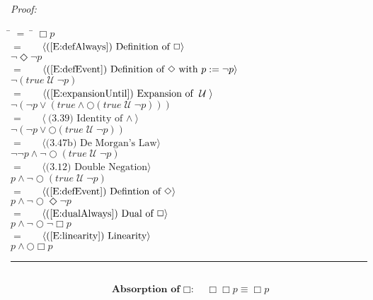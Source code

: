 \documentclass[fleqn, leqno]{article}
\newcommand{\lgap}{2pt}                             %
\newcommand{\mymathindent}{24pt}                    %
\newcommand{\Until}{\;\mathcal{U}\;}
\newcommand{\Next}{\bigcirc}
\newcommand{\Event}{\Diamond}
\newcommand{\Always}{\Box}
\newcommand{\myqed}{\hfill\rule[-.23ex]{1.2ex}{2.0ex}}
\newcommand{\Gll} {\langle}                         %
\newcommand{\Ggg} {\rangle}                         %
\newcommand{\Hint}[1]     {\ \ \ $\Gll              \mbox{#1} \Ggg$ }   %
\begin{document}
\emph{Proof:}
\begin{tabbing}
\hspace{\mymathindent} \= $= \;$ \= \kill
  \> \>   $\Always p$\\[\lgap]
  \> $=$  \>  \Hint{(\ref{E:defAlways}) Definition of $\Always$}\\[\lgap]
  \> \>   $\lnot\Event\lnot p$\\[\lgap]
  \> $=$  \>  \Hint{(\ref{E:defEvent}) Definition of $\Event$ with $p := \lnot p$}\\[\lgap]
  \> \>   $\lnot(true \Until \lnot p)$\\[\lgap]
  \> $=$  \>  \Hint{(\ref{E:expansionUntil}) Expansion of $\Until$}\\[\lgap]
  \> \>   $\lnot(\lnot p \lor (true \land \Next(true \Until \lnot p)))$\\[\lgap]
  \> $=$  \>  \Hint{(3.39) Identity of $\land$}\\[\lgap]
  \> \>   $\lnot(\lnot p \lor \Next(true \Until \lnot p))$\\[\lgap]
  \> $=$  \>  \Hint{(3.47b) De Morgan's Law}\\[\lgap]
  \> \>   $\lnot\lnot p \land \lnot\Next(true \Until \lnot p)$\\[\lgap]
  \> $=$  \>  \Hint{(3.12) Double Negation}\\[\lgap]
  \> \>   $p \land \lnot\Next(true \Until \lnot p)$\\[\lgap]
  \> $=$  \>  \Hint{(\ref{E:defEvent}) Defintion of $\Event$}\\[\lgap]
  \> \>   $p \land \lnot\Next\Event\lnot p$\\[\lgap]
  \> $=$  \>  \Hint{(\ref{E:dualAlways}) Dual of $\Always$}\\[\lgap]
  \> \>   $p \land \lnot\Next\lnot\Always p$\\[\lgap]
  \> $=$  \>  \Hint{(\ref{E:linearity}) Linearity}\\[\lgap]
  \> \>   $p \land \Next\Always p$\\[\lgap]
\end{tabbing}
\myqed\\[\lgap]


\begin{equation}\label{E:IdemAlways}
\textbf{Absorption of $\Always$:}\quad \Always\Always p \equiv \Always p
\end{equation}
\end{document}
